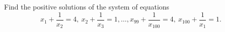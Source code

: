 Find the positive solutions of the system of equations
\[ x_1 + \frac{1}{x_2} = 4,\ x_2 + \frac{1}{x_3} = 1, \ldots, x_{99} + \frac{1}{x_{100}} = 4,\ x_{100} + \frac{1}{x_1} = 1. \]
